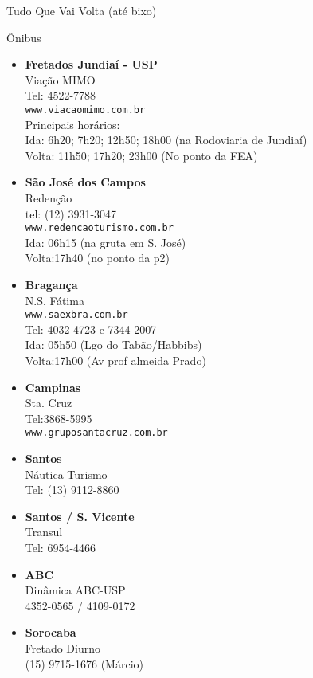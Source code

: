 \begin{secao}{Tudo Que Vai Volta (até bixo)}
\begin{subsecao}{Ônibus}
\begin{itemize}
  \item {\bf Fretados Jundiaí - USP}\\
    Viação MIMO\\
    Tel: 4522-7788\\
    {\tt www.viacaomimo.com.br}\\
    Principais horários:\\
    Ida: 6h20; 7h20; 12h50; 18h00 (na Rodoviaria de Jundiaí)\\
    Volta: 11h50; 17h20; 23h00 (No ponto da FEA)

  \item {\bf São José dos Campos}\\
    Redenção\\
    tel: (12) 3931-3047\\
    {\tt www.redencaoturismo.com.br}\\
    Ida: 06h15 (na gruta em S. José)\\
    Volta:17h40 (no ponto da p2)

  \item {\bf Bragança}\\
    N.S. Fátima\\
    {\tt www.saexbra.com.br}\\
    Tel: 4032-4723 e 7344-2007\\
    Ida: 05h50 (Lgo do Tabão/Habbibs)\\
    Volta:17h00 (Av prof almeida Prado)

  \item {\bf Campinas}\\
    Sta. Cruz\\
    Tel:3868-5995\\
    {\tt www.gruposantacruz.com.br}

  \item {\bf Santos}\\
    Náutica Turismo\\
    Tel: (13) 9112-8860

  \item {\bf Santos / S. Vicente}\\
    Transul\\
    Tel: 6954-4466

  \item {\bf ABC}\\
    Dinâmica ABC-USP\\
    4352-0565 / 4109-0172

  \item {\bf Sorocaba}\\
    Fretado Diurno\\
    (15) 9715-1676 (Márcio)


\end{itemize}
\end{subsecao}
\end{secao}

